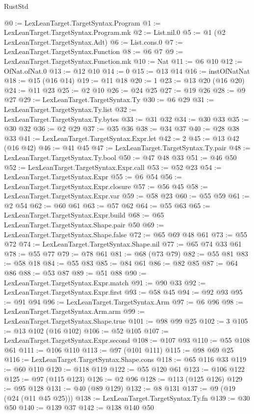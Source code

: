 \begin{lexlean}{RustStd}
\begin{coremodule}
{\begin{coremodule}
{{{{{{{{{{{{@0 := LexLeanTarget.TargetSyntax.Program
@1 := LexLeanTarget.TargetSyntax.Program.mk
@2 := List.nil.{0}
@5 := @1 (@2 LexLeanTarget.TargetSyntax.Adt)
@6 := List.cons.{0}
@7 := LexLeanTarget.TargetSyntax.Function
@8 := @6 @7
@9 := LexLeanTarget.TargetSyntax.Function.mk
@10 := Nat
@11 := @6 @10
@12 := OfNat.ofNat.{0}
@13 := @12 @10
@14 := 0
@15 := @13 @14
@16 := instOfNatNat
@18 := @15 (@16 @14)
@19 := @11 @18
@20 := 1
@23 := @13 @20 (@16 @20)
@24 := @11 @23
@25 := @2 @10
@26 := @24 @25
@27 := @19 @26
@28 := @9 @27
@29 := LexLeanTarget.TargetSyntax.Ty
@30 := @6 @29
@31 := LexLeanTarget.TargetSyntax.Ty.list
@32 := LexLeanTarget.TargetSyntax.Ty.bytes
@33 := @31 @32
@34 := @30 @33
@35 := @30 @32
@36 := @2 @29
@37 := @35 @36
@38 := @34 @37
@40 := @28 @38 @33
@41 := LexLeanTarget.TargetSyntax.Expr.let
@42 := 2
@45 := @13 @42 (@16 @42)
@46 := @41 @45
@47 := LexLeanTarget.TargetSyntax.Ty.pair
@48 := LexLeanTarget.TargetSyntax.Ty.bool
@50 := @47 @48 @33
@51 := @46 @50
@52 := LexLeanTarget.TargetSyntax.Expr.call
@53 := @52 @23
@54 := LexLeanTarget.TargetSyntax.Expr
@55 := @6 @54
@56 := LexLeanTarget.TargetSyntax.Expr.closure
@57 := @56 @45
@58 := LexLeanTarget.TargetSyntax.Expr.var
@59 := @58 @23
@60 := @55 @59
@61 := @2 @54
@62 := @60 @61
@63 := @57 @62
@64 := @55 @63
@65 := LexLeanTarget.TargetSyntax.Expr.build
@68 := @65 LexLeanTarget.TargetSyntax.Shape.pair @50
@69 := LexLeanTarget.TargetSyntax.Shape.false
@72 := @65 @69 @48 @61
@73 := @55 @72
@74 := LexLeanTarget.TargetSyntax.Shape.nil
@77 := @65 @74 @33 @61
@78 := @55 @77
@79 := @78 @61
@81 := @68 (@73 @79)
@82 := @55 @81
@83 := @58 @18
@84 := @55 @83
@85 := @84 @61
@86 := @82 @85
@87 := @64 @86
@88 := @53 @87
@89 := @51 @88
@90 := LexLeanTarget.TargetSyntax.Expr.match
@91 := @90 @33
@92 := LexLeanTarget.TargetSyntax.Expr.first
@93 := @58 @45
@94 := @92 @93
@95 := @91 @94
@96 := LexLeanTarget.TargetSyntax.Arm
@97 := @6 @96
@98 := LexLeanTarget.TargetSyntax.Arm.arm
@99 := LexLeanTarget.TargetSyntax.Shape.true
@101 := @98 @99 @25
@102 := 3
@105 := @13 @102 (@16 @102)
@106 := @52 @105
@107 := LexLeanTarget.TargetSyntax.Expr.second
@108 := @107 @93
@110 := @55 @108 @61
@111 := @106 @110
@113 := @97 (@101 @111)
@115 := @98 @69 @25
@116 := LexLeanTarget.TargetSyntax.Shape.cons
@118 := @65 @116 @33
@119 := @60 @110
@120 := @118 @119
@122 := @55 @120 @61
@123 := @106 @122
@125 := @97 (@115 @123)
@126 := @2 @96
@128 := @113 (@125 @126)
@129 := @95 @128
@131 := @40 (@89 @129)
@132 := @8 @131
@137 := @9 (@19 (@24 (@11 @45 @25)))
@138 := LexLeanTarget.TargetSyntax.Ty.fn
@139 := @30 @50
@140 := @139 @37
@142 := @138 @140 @50
}}}}}}}}}}}}
\end{coremodule}}
\end{coremodule}
\end{lexlean}
